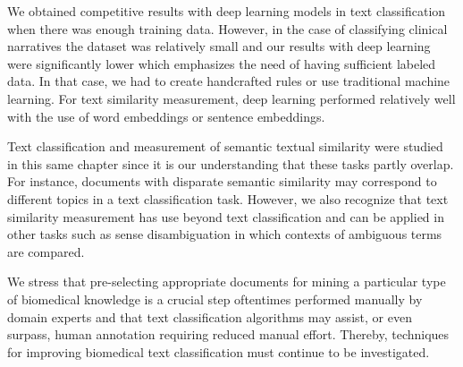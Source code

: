 We obtained competitive results with deep learning models in text classification when there was enough training data.
However, in the case of classifying clinical narratives the dataset was relatively small and our results with deep learning were significantly lower which emphasizes the need of having sufficient labeled data.
In that case, we had to create handcrafted rules or use traditional machine learning.
For text similarity measurement, deep learning performed relatively well with the use of word embeddings or sentence embeddings.

Text classification and measurement of semantic textual similarity were studied in this same chapter since it is our understanding that these tasks partly overlap.
For instance, documents with disparate semantic similarity may correspond to different topics in a text classification task.
However, we also recognize that text similarity measurement has use beyond text classification and can be applied in other tasks such as sense disambiguation in which contexts of ambiguous terms are compared.

We stress that pre-selecting appropriate documents for mining a particular type of biomedical knowledge is a crucial step oftentimes performed manually by domain experts and that text classification algorithms may assist, or even surpass, human annotation requiring reduced manual effort.
Thereby, techniques for improving biomedical text classification must continue to be investigated.

